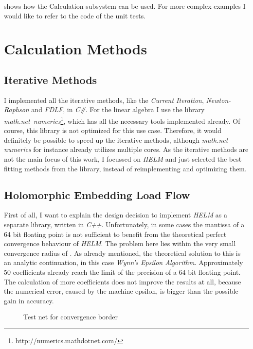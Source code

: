  shows how the Calculation subsystem can be used. For more complex examples I would like to refer to the code of the unit tests.

\section{Calculation Methods}
\label{sec:implementation_calculation_methods}

\subsection{Iterative Methods}
I implemented all the iterative methods, like the \emph{Current Iteration}, \emph{Newton-Raphson} and \emph{FDLF}, in \emph{C\#}. For the linear algebra I use the library \mbox{\emph{math.net numerics}\footnote{http://numerics.mathdotnet.com/}}, which has all the necessary tools implemented already. Of course, this library is not optimized for this use case. Therefore, it would definitely be possible to speed up the iterative methods, although \emph{math.net numerics} for instance already utilizes multiple cores. As the iterative methods are not the main focus of this work, I focussed on \emph{HELM} and just selected the best fitting methods from the library, instead of reimplementing and optimizing them.

\subsection{Holomorphic Embedding Load Flow}
\label{sec:implementation_helm}
First of all, I want to explain the design decision to implement \emph{HELM} as a separate library, written in \emph{C++}. Unfortunately, in some cases the mantissa of a 64 bit floating point is not sufficient to benefit from the theoretical perfect convergence behaviour of \emph{HELM}. The problem here lies within the very small convergence radius of . As already mentioned, the theoretical solution to this is an analytic continuation, in this case \emph{Wynn's Epsilon Algorithm}. Approximately 50 coefficients already reach the limit of the precision of a 64 bit floating point. The calculation of more coefficients does not improve the results at all, because the numerical error, caused by the machine epsilon, is bigger than the possible gain in accuracy.

\begin{figure}
	\centering
	
	\caption{Test net for convergence border}
	\label{fig:convergence_border_net}
\end{figure}

